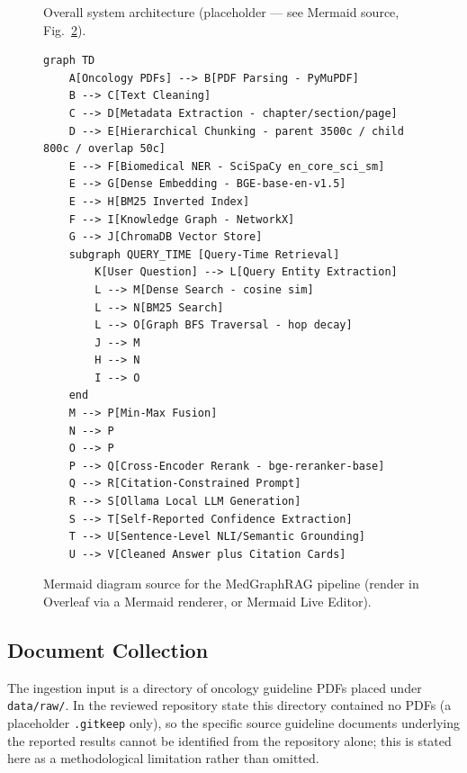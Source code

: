 \documentclass[conference]{IEEEtran}
\begin{document}
\begin{figure}[H]
\centering
{}
\caption{Overall system architecture (placeholder — see Mermaid source, Fig.~\ref{fig:mermaid1}).}
\label{fig:architecture}
\end{figure}

\begin{figure}[H]
\centering
\begin{lstlisting}[language=mermaid]
graph TD
    A[Oncology PDFs] --> B[PDF Parsing - PyMuPDF]
    B --> C[Text Cleaning]
    C --> D[Metadata Extraction - chapter/section/page]
    D --> E[Hierarchical Chunking - parent 3500c / child 800c / overlap 50c]
    E --> F[Biomedical NER - SciSpaCy en_core_sci_sm]
    E --> G[Dense Embedding - BGE-base-en-v1.5]
    E --> H[BM25 Inverted Index]
    F --> I[Knowledge Graph - NetworkX]
    G --> J[ChromaDB Vector Store]
    subgraph QUERY_TIME [Query-Time Retrieval]
        K[User Question] --> L[Query Entity Extraction]
        L --> M[Dense Search - cosine sim]
        L --> N[BM25 Search]
        L --> O[Graph BFS Traversal - hop decay]
        J --> M
        H --> N
        I --> O
    end
    M --> P[Min-Max Fusion]
    N --> P
    O --> P
    P --> Q[Cross-Encoder Rerank - bge-reranker-base]
    Q --> R[Citation-Constrained Prompt]
    R --> S[Ollama Local LLM Generation]
    S --> T[Self-Reported Confidence Extraction]
    T --> U[Sentence-Level NLI/Semantic Grounding]
    U --> V[Cleaned Answer plus Citation Cards]
\end{lstlisting}
\caption{Mermaid diagram source for the MedGraphRAG pipeline (render in Overleaf via a Mermaid renderer, or Mermaid Live Editor).}
\label{fig:mermaid1}
\end{figure}

\subsection{Document Collection}
The ingestion input is a directory of oncology guideline PDFs placed under \texttt{data/raw/}. In the reviewed repository state this directory contained no PDFs (a placeholder \texttt{.gitkeep} only), so the specific source guideline documents underlying the reported results cannot be identified from the repository alone; this is stated here as a methodological limitation rather than omitted.
\end{document}

